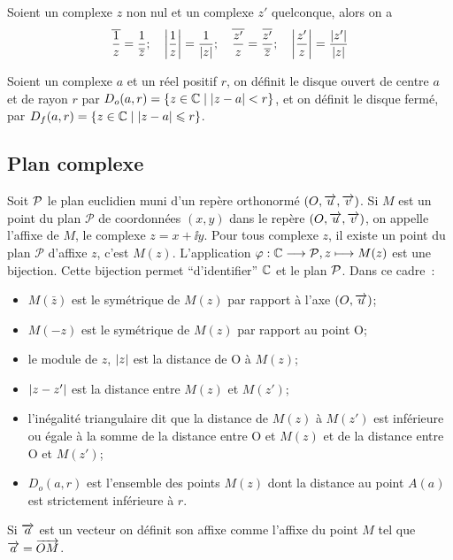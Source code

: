 \begin{prop}
    Soient un complexe \(z\) non nul et un complexe \(z'\) quelconque, alors on 
    a
    \begin{equation}
        \bar{\frac{1}{z}}=\frac{1}{\bar{z}}; \quad 
        \abs{\frac{1}{z}}=\frac{1}{\abs{z}}; \quad
        \bar{\frac{z'}{z}}=\frac{\bar{z'}}{\bar{z}}; \quad 
        \abs{\frac{z'}{z}}=\frac{\abs{z'}}{\abs{z}}
    \end{equation}
\end{prop}
\begin{defdef}
    Soient un complexe \(a\) et un réel positif \(r\), on définit le disque 
    ouvert de centre \(a\) et de rayon \(r\) par 
    \(D_o(a,r)=\enstq{z\in\C}{\abs{z-a}<r}\), et on définit le disque fermé, par 
    \(D_f(a,r)=\enstq{z\in\C}{\abs{z-a}\leqslant r}\).
\end{defdef}
\subsection{Plan complexe}
\label{subsec:plancomplexe}
Soit \(\P\) le plan euclidien muni d'un repère orthonormé \((O,\vect{u}, 
\vect{v})\). Si \(M\) est un point du plan \(\mathcal{P}\) de coordonnées 
\((x,y)\) dans le repère \((O,\vect{u}, \vect{v})\), on appelle l'affixe de 
\(M\), le complexe \(z=x + \ii y\). Pour tous complexe \(z\), il existe un point 
du plan \(\mathcal{P}\) d'affixe \(z\), c'est \(M(z)\). L'application 
\(\fonctionL{\varphi}{\C}{\P}{z}{M(z)}\) est une bijection. Cette bijection 
permet ``d'identifier'' \(\C\) et le plan \(\P\). Dans ce cadre~:
\begin{itemize}
    \item \(M(\bar{z})\) est le symétrique de \(M(z)\) par rapport à l'axe 
        \((O,\vect{u})\);
    \item \(M(-z)\) est le symétrique de \(M(z)\) par rapport au point O;
    \item le module de \(z\), \(\abs{z}\) est la distance de O à \(M(z)\);
    \item \(\abs{z-z'}\) est la distance entre \(M(z)\) et \(M(z')\);
    \item l'inégalité triangulaire dit que la distance de \(M(z)\) à \(M(z')\) 
        est inférieure ou égale à la somme de la distance entre O et \(M(z)\) et 
        de la distance entre O et \(M(z')\);
    \item \(D_o(a,r)\) est l'ensemble des points \(M(z)\) dont la distance au 
        point \(A(a)\) est strictement inférieure à \(r\).
\end{itemize}
Si \(\vect{a}\) est un vecteur on définit son affixe comme l'affixe du point 
\(M\) tel que \(\vect{a}=\vect{OM}\).
